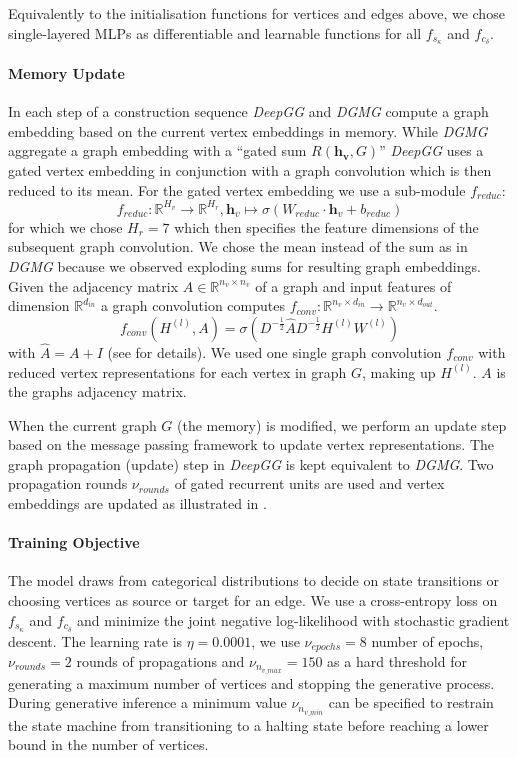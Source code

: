 \documentclass{article}
\begin{document}
Equivalently to the initialisation functions for vertices and edges above, we chose single-layered MLPs as differentiable and learnable functions for all $f_{s_{\kappa}}$ and $f_{c_{\delta}}$.


\paragraph{Memory Update} In each step of a construction sequence \textit{DeepGG} and \textit{DGMG} compute a graph embedding based on the current vertex embeddings in memory.
While \textit{DGMG} aggregate a graph embedding with a ``gated sum $R(\boldsymbol{h_v}, G)$'' \textit{DeepGG} uses a gated vertex embedding in conjunction with a graph convolution \cite{kipf2016semi} which is then reduced to its mean.
For the gated vertex embedding we use a sub-module $f_{reduc}$:
\[
	f_{reduc}: \mathbb{R}^{H_v} \rightarrow \mathbb{R}^{H_{r}}, \boldsymbol{h}_v \mapsto \sigma\left( W_{reduc}\cdot\boldsymbol{h}_v + b_{reduc} \right)
\]
for which we chose $H_{r} = 7$ which then specifies the feature dimensions of the subsequent graph convolution.
We chose the mean instead of the sum as in \textit{DGMG} because we observed exploding sums for resulting graph embeddings.
Given the adjacency matrix $A\in\mathbb{R}^{n_v\times n_v}$ of a graph and input features of dimension $\mathbb{R}^{d_{in}}$ a graph convolution computes $f_{conv}: \mathbb{R}^{n_v\times d_{in}} \rightarrow \mathbb{R}^{n_v\times d_{out}}$.
\[
	f_{conv}(H^{(l)}, A) = \sigma\left( D^{-\frac{1}{2}} \hat{A} D^{-\frac{1}{2}} H^{(l)}W^{(l)} \right)
\]
with $\hat{A} = A + I$ (see \cite{kipf2016semi} for details).
We used one single graph convolution $f_{conv}$ with reduced vertex representations for each vertex in graph $G$, making up $H^{(l)}$.
$A$ is the graphs adjacency matrix.

When the current graph $G$ (the memory) is modified, we perform an update step based on the message passing framework \cite{gilmer2017neural} to update vertex representations.
The graph propagation (update) step in \textit{DeepGG} is kept equivalent to \textit{DGMG}.
Two propagation rounds $\nu_{rounds}$ of gated recurrent units are used and vertex embeddings are updated as illustrated in \cite[figure 2]{li2018learning}.


\paragraph{Training Objective} The model draws from categorical distributions to decide on state transitions or choosing vertices as source or target for an edge.
We use a cross-entropy loss on $f_{s_{\kappa}}$ and $f_{c_{\delta}}$ and minimize the joint negative log-likelihood with stochastic gradient descent.
The learning rate is $\eta = 0.0001$, we use $\nu_{epochs} = 8$ number of epochs, $\nu_{rounds} = 2$ rounds of propagations and $\nu_{n_{v\_max}} = 150$ as a hard threshold for generating a maximum number of vertices and stopping the generative process.
During generative inference a minimum value $\nu_{n_{v\_min}}$ can be specified to restrain the state machine from transitioning to a halting state before reaching a lower bound in the number of vertices.
\end{document}
